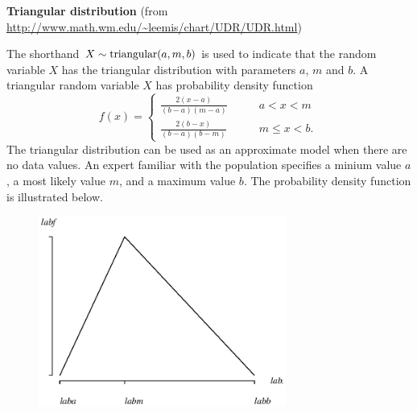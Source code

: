 \documentclass[12pt,fullpage]{article}
\begin{document}
\noindent
{\bf Triangular distribution} (from \color{blue}\url{http://www.math.wm.edu/~leemis/chart/UDR/UDR.html}\color{black})

\noindent
The shorthand $X \sim {\rm triangular}(a, m, b)$ is used to indicate that the
random variable $X$ has the triangular distribution with parameters $a$, $m$ and $b$.
A triangular random variable $X$ has probability density function 
$$
f(x) = \left\{ \begin{array}{ll}
		\frac{2 (x - a)}{(b - a) (m - a)} & \qquad a < x < m \\ [0.05in]
		\frac{2 (b - x)}{(b - a) (b - m)} & \qquad m \leq x < b.
		\end{array} \right. \, 
$$		
The triangular distribution can be used as an approximate model when there are no data values.
An expert familiar with the population specifies a minium value $a$, a most likely value $m$,
and a maximum value $b$.
The probability density function is illustrated below.
{\begin{figure}[h!]
\begin{center}
\includegraphics[width=3.2in]{TriangularPlot.ps}
\end{center}
\end{figure}}
\end{document}
